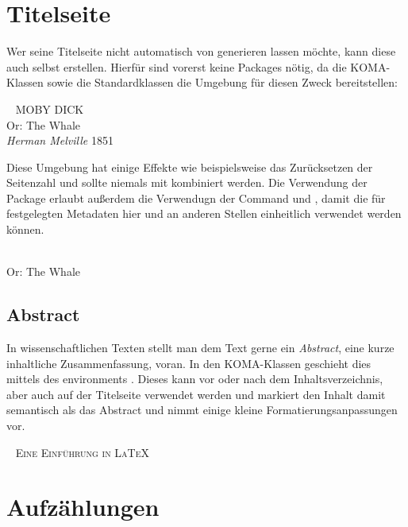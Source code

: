\section{Titelseite}
Wer seine Titelseite nicht automatisch von  generieren lassen möchte, kann diese auch selbst erstellen.
Hierfür sind vorerst keine Packages nötig, da die KOMA-Klassen sowie die Standardklassen die Umgebung  für diesen Zweck bereitstellen:
\begin{latexlisting}
	\begin{titlepage}
		\centering
		~\vfill
		{
			\Huge
			\scshape
			MOBY DICK
		}\\
		\bigskip
		{
			\Large
			Or: The Whale
		}\\
		\vspace{2cm}
		{
			\itshape
			Herman Melville
		}
		\vfill
		1851
	\end{titlepage}
\end{latexlisting}
Diese Umgebung hat einige Effekte wie beispielsweise das Zurücksetzen der Seitenzahl und sollte niemals mit  kombiniert werden.
Die Verwendung der Package  erlaubt außerdem die Verwendugn der Command  und , damit die für  festgelegten Metadaten hier  und an anderen Stellen einheitlich verwendet werden können.
\begin{latexlisting}
	\begin{titlepage}
		\centering
		~\vfill
		{
			\Huge
			\thetitle
		}\\
		\bigskip
		{
			\Large
			Or: The Whale
		}\\
		\vspace{2cm}
		{
			\itshape
			\theautor
		}
		\vfill
		\thedate
	\end{titlepage}
\end{latexlisting}

\subsection{Abstract}
In wissenschaftlichen Texten stellt man dem Text gerne ein \emph{Abstract}, eine kurze inhaltliche Zusammenfassung, voran.
In den KOMA-Klassen geschieht dies mittels des environments .
Dieses kann vor oder nach dem Inhaltsverzeichnis, aber auch auf der Titelseite verwendet werden und markiert den Inhalt damit semantisch als das Abstract und nimmt einige kleine Formatierungsanpassungen vor.
\begin{latexlisting}
	\begin{titlepage}
		\centering
		~\vfill
		{
			\Huge
			\scshape
			Eine Einführung in \LaTeX{}
		}
		\vfill
		\begin{abstract}
			In diesem Dokument diskutieren wir Grundlagen der Textsatzprogrammsammlung \LaTeX{}.
		\end{abstract}
		\vfill
	\end{titlepage}
\end{latexlisting}

\section{Aufzählungen}
